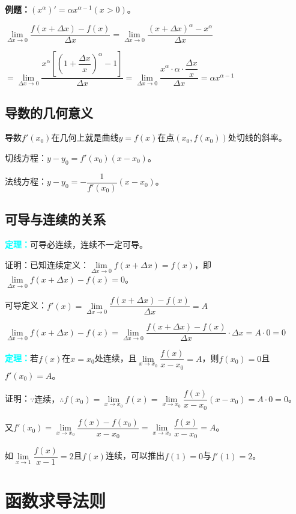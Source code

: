 \documentclass[UTF8, 12pt]{ctexart}
\begin{document}
\textbf{例题：}$\left(x^\alpha\right)'=\alpha x^{\alpha-1}(x>0)$。\medskip

$\lim\limits_{\Delta x\to 0}\dfrac{f(x+\Delta x)-f(x)}{\Delta x}=\lim\limits_{\Delta x\to 0}\dfrac{\left(x+\Delta x\right)^\alpha-x^\alpha}{\Delta x}$\medskip

$=\lim\limits_{\Delta x\to 0}\dfrac{x^\alpha\left[\left(1+\dfrac{\Delta x}{x}\right)^\alpha-1\right]}{\Delta x}=\lim\limits_{\Delta x\to 0}\dfrac{x^\alpha\cdot\alpha\cdot\dfrac{\Delta x}{x}}{\Delta x}=\alpha x^{\alpha-1}$

\subsection{导数的几何意义}

导数$f'(x_0)$在几何上就是曲线$y=f(x)$在点$(x_0,f(x_0))$处切线的斜率。

切线方程：$y-y_0=f'(x_0)(x-x_0)$。

法线方程：$y-y_0=-\dfrac{1}{f'(x_0)}(x-x_0)$。

\subsection{可导与连续的关系}

\textcolor{aqua}{\textbf{定理：}}可导必连续，连续不一定可导。

证明：已知连续定义：$\lim\limits_{\Delta x\to 0}f(x+\Delta x)=f(x)$，即$\lim\limits_{\Delta x\to 0}f(x+\Delta x)-f(x)=0$。

可导定义：$f'(x)=\lim\limits_{\Delta x\to 0}\dfrac{f(x+\Delta x)-f(x)}{\Delta x} = A$

$\lim\limits_{\Delta x\to 0}f(x+\Delta x)-f(x)=\lim\limits_{\Delta x\to 0}\dfrac{f(x+\Delta x)-f(x)}{\Delta x}\cdot\Delta x=A\cdot 0=0$

\textcolor{aqua}{\textbf{定理：}}若$f(x)$在$x=x_0$处连续，且$\lim\limits_{x\to x_0}\dfrac{f(x)}{x-x_0}=A$，则$f(x_0)=0$且$f'(x_0)=A$。

证明：$\because\text{连续，}\therefore f(x_0)=\lim\limits_{x\to x_0}f(x)=\lim\limits_{x\to x_0}\dfrac{f(x)}{x-x_0}(x-x_0)=A\cdot 0=0$。

又$f'(x_0)=\lim\limits_{x\to x_0}\dfrac{f(x)-f(x_0)}{x-x_0}=\lim\limits_{x\to x_0}\dfrac{f(x)}{x-x_0}=A$。

如$\lim\limits_{x\to 1}\dfrac{f(x)}{x-1}=2$且$f(x)$连续，可以推出$f(1)=0$与$f'(1)=2$。

\section{函数求导法则}
\end{document}
